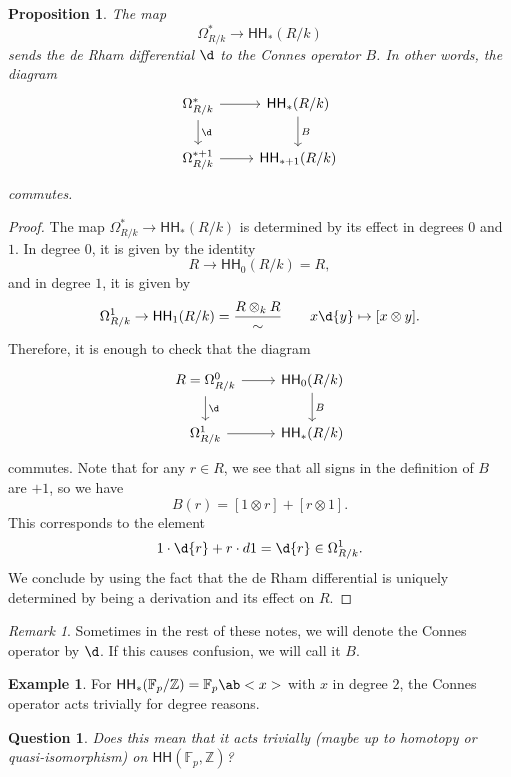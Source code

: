 \documentclass[10pt, oneside]{memoir}
\newtheorem{prop}[thm]{Proposition}
\newtheorem{quest}[thm]{Question}
\theoremstyle{definition}
\newtheorem{exm}[thm]{Example}
\theoremstyle{remark}
\newtheorem{rmk}[thm]{Remark}
\theoremstyle{plain}
\theoremstyle{definition}
\theoremstyle{remark}
\newcommand{\Z}{\mathbb{Z}}
\newcommand{\F}{\mathbb{F}}
\newcommand{\ms}[1]{\mathsf{#1}}
\newcommand{\1}{\mathbf{1}}
\newcommand{\2}{\mathbf{2}}
\newcommand{\3}{\mathbf{3}}
\newcommand{\HH}{\ms{HH}}
\begin{document}
\begin{prop}
    The map 
    \[ \Omega^*_{R/k} \to \HH_*(R/k) \]
    sends the de Rham differential $\d$ to the Connes operator $B$. In other words, the diagram
    \begin{equation*}
    \begin{tikzcd}
        \Omega^*_{R/k} \ar{r} \ar{d}{\d} & \HH_*(R/k) \ar{d}{B} \\
        \Omega^{*+1}_{R/k} \ar{r} & \HH_{*+1}(R/k)
    \end{tikzcd}
    \end{equation*}
    commutes.
\end{prop}

\begin{proof}
    The map $\Omega^*_{R/k} \to \HH_*(R/k)$ is determined by its effect in degrees $0$ and $1$. In degree $0$, it is given by the identity
    \[ R \to \HH_0(R/k) = R, \]
    and in degree $1$, it is given by
    \[ \Omega^1_{R/k} \to \HH_1(R/k) = \frac{R \otimes_k R}{\sim} \qquad x \d{y} \mapsto [x \otimes y]. \]
    Therefore, it is enough to check that the diagram
    \begin{equation*}
    \begin{tikzcd}
        R = \Omega^0_{R/k} \ar{r} \ar{d}{\d} & \HH_0(R/k) \ar{d}{B} \\
        \Omega^1_{R/k} \ar{r} & \HH_*(R/k)
    \end{tikzcd}
    \end{equation*}
    commutes. Note that for any $r \in R$, we see that all signs in the definition of $B$ are $+1$, so we have
    \[ B(r) = [1 \otimes r] + [r \otimes 1]. \]
    This corresponds to the element
    \[ 1 \cdot \d{r} + r \cdot d{1} = \d{r} \in \Omega^1_{R/k}. \]
    We conclude by using the fact that the de Rham differential is uniquely determined by being a derivation and its effect on $R$.
\end{proof}

\begin{rmk}
    Sometimes in the rest of these notes, we will denote the Connes operator by $\d$. If this causes confusion, we will call it $B$.
\end{rmk}

\begin{exm}
    For $\HH_*(\F_p/\Z) = \F_p \ab<x>$ with $x$ in degree $2$, the Connes operator acts trivially for degree reasons.
\end{exm}

\begin{quest}
    Does this mean that it acts trivially (maybe up to homotopy or quasi-isomorphism) on $\HH(\F_p, \Z)$?
\end{quest}
\end{document}

